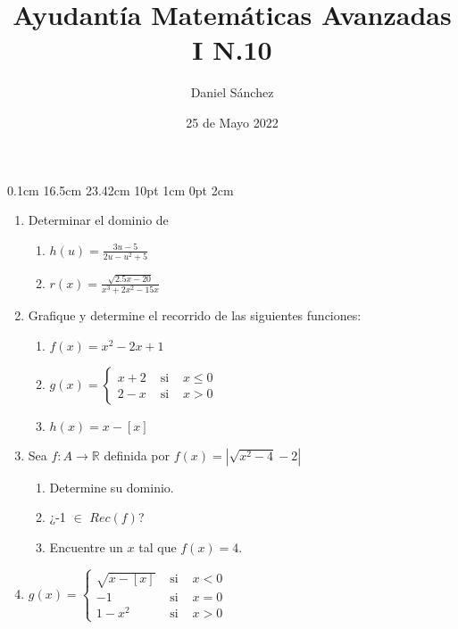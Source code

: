 \documentclass[12pt]{article}
\newcommand{\D}{\displaystyle}
\begin{document}
\setmargins{2.5cm}
{0.1cm}
{16.5cm}
{23.42cm}
{10pt}
{1cm}
{0pt}
{2cm}

\title{Ayudant\'ia Matem\'aticas Avanzadas I N.10}
\date{25 de Mayo 2022}
\author{Daniel S\'anchez}
\maketitle

\begin{enumerate}
	\item Determinar el dominio de
	      \begin{enumerate}
		      \item $\D h(u)=\frac{3u-5}{2u-u^2+5}$
		      \item $\D r(x)=\frac{\sqrt{2.5x-20}}{x^3+2x^2-15x}$
	      \end{enumerate}
	\item Grafique y determine el recorrido de las siguientes funciones:
	      \begin{enumerate}
		      \item $f(x)=x^2-2x+1$
		      \item $g(x)=\left\{\begin{array}{ccc}
				            x+2 & \mbox{ si } & x\leq 0 \\
				            2-x & \mbox{ si } & x>0
			            \end{array}\right.$
		      \item $h(x) = x-[x]$
	      \end{enumerate}
	\item Sea $f: A \rightarrow \mathbb{R}$ definida por $f(x) = \left\lvert \sqrt{x^2-4} - 2\right\rvert $
	      \begin{enumerate}
		      \item Determine su dominio.
		      \item ¿-1 $\in$ $Rec(f)$?
		      \item Encuentre un $x$ tal que $f(x) = 4$.
	      \end{enumerate}
	\item $g(x)=\left\{\begin{array}{ccc}
			      \sqrt{x-[x]} & \mbox{ si } & x<0 \\
			      -1           & \mbox{ si } & x=0 \\
			      1-x^2        & \mbox{ si } & x>0
		      \end{array}\right.$
\end{enumerate}
\end{document}
